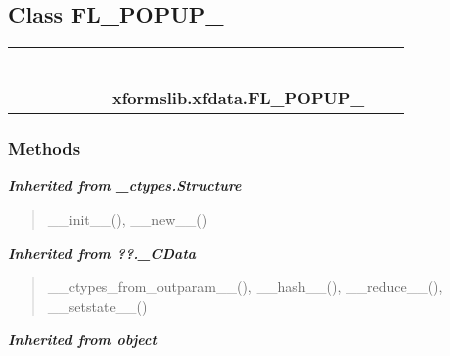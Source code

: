 \subsection{Class FL\_POPUP\_}

    \label{xformslib:xfdata:FL_POPUP_}
\begin{tabular}{cccccccccc}
\multicolumn{2}{r}{\settowidth{\BCL}{object}\multirow{2}{\BCL}{object}}
&&
&&
&&
  \\\cline{3-3}
  &&\multicolumn{1}{c|}{}
&&
&&
&&
  \\
\multicolumn{4}{r}{\settowidth{\BCL}{??.\_CData}\multirow{2}{\BCL}{??.\_CData}}
&&
&&
  \\\cline{5-5}
  &&&&\multicolumn{1}{c|}{}
&&
&&
  \\
\multicolumn{6}{r}{\settowidth{\BCL}{\_ctypes.Structure}\multirow{2}{\BCL}{\_ctypes.Structure}}
&&
  \\\cline{7-7}
  &&&&&&\multicolumn{1}{c|}{}
&&
  \\
&&&&&&\multicolumn{2}{l}{\textbf{xformslib.xfdata.FL\_POPUP\_}}
\end{tabular}



  \subsubsection{Methods}


\large{\textbf{\textit{Inherited from \_ctypes.Structure}}}

\begin{quote}
\_\_init\_\_(), \_\_new\_\_()
\end{quote}

\large{\textbf{\textit{Inherited from ??.\_CData}}}

\begin{quote}
\_\_ctypes\_from\_outparam\_\_(), \_\_hash\_\_(), \_\_reduce\_\_(), \_\_setstate\_\_()
\end{quote}

\large{\textbf{\textit{Inherited from object}}}

